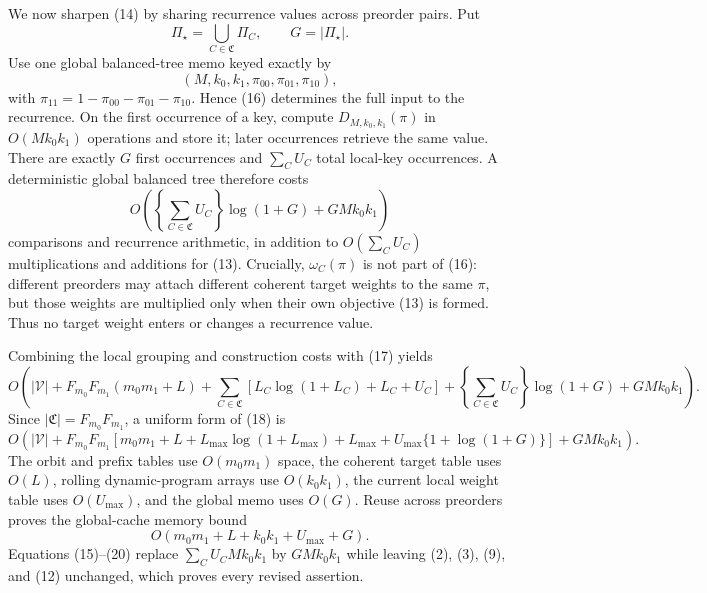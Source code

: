 We now sharpen (14) by sharing recurrence values across preorder pairs. Put
\[
\Pi_\star=\bigcup_{C\in\mathfrak C}\Pi_C,\qquad G=|\Pi_\star|. \tag{15}
\]
Use one global balanced-tree memo keyed exactly by
\[
(M,k_0,k_1,\pi_{00},\pi_{01},\pi_{10}), \tag{16}
\]
with \(\pi_{11}=1-\pi_{00}-\pi_{01}-\pi_{10}\). Hence (16) determines the full input to the recurrence. On the first occurrence of a key, compute \(D_{M,k_0,k_1}(\pi)\) in \(O(Mk_0k_1)\) operations and store it; later occurrences retrieve the same value. There are exactly \(G\) first occurrences and \(\sum_CU_C\) total local-key occurrences. A deterministic global balanced tree therefore costs
\[
O\!\left(\left\{\sum_{C\in\mathfrak C}U_C\right\}\log(1+G)+GMk_0k_1\right) \tag{17}
\]
comparisons and recurrence arithmetic, in addition to \(O(\sum_CU_C)\) multiplications and additions for (13). Crucially, \(\omega_C(\pi)\) is not part of (16): different preorders may attach different coherent target weights to the same \(\pi\), but those weights are multiplied only when their own objective (13) is formed. Thus no target weight enters or changes a recurrence value.

Combining the local grouping and construction costs with (17) yields
\[
O\!\left(
|\mathcal V|+F_{m_0}F_{m_1}(m_0m_1+L)
+\sum_{C\in\mathfrak C}\left[L_C\log(1+L_C)+L_C+U_C\right]
+\left\{\sum_{C\in\mathfrak C}U_C\right\}\log(1+G)+GMk_0k_1
\right). \tag{18}
\]
Since \(|\mathfrak C|=F_{m_0}F_{m_1}\), a uniform form of (18) is
\[
O\!\left(
|\mathcal V|+F_{m_0}F_{m_1}\left[m_0m_1+L+L_{\max}\log(1+L_{\max})+L_{\max}+U_{\max}\{1+\log(1+G)\}\right]+GMk_0k_1
\right). \tag{19}
\]
The orbit and prefix tables use \(O(m_0m_1)\) space, the coherent target table uses \(O(L)\), rolling dynamic-program arrays use \(O(k_0k_1)\), the current local weight table uses \(O(U_{\max})\), and the global memo uses \(O(G)\). Reuse across preorders proves the global-cache memory bound
\[
O(m_0m_1+L+k_0k_1+U_{\max}+G). \tag{20}
\]
Equations (15)--(20) replace \(\sum_CU_CMk_0k_1\) by \(GMk_0k_1\) while leaving (2), (3), (9), and (12) unchanged, which proves every revised assertion.